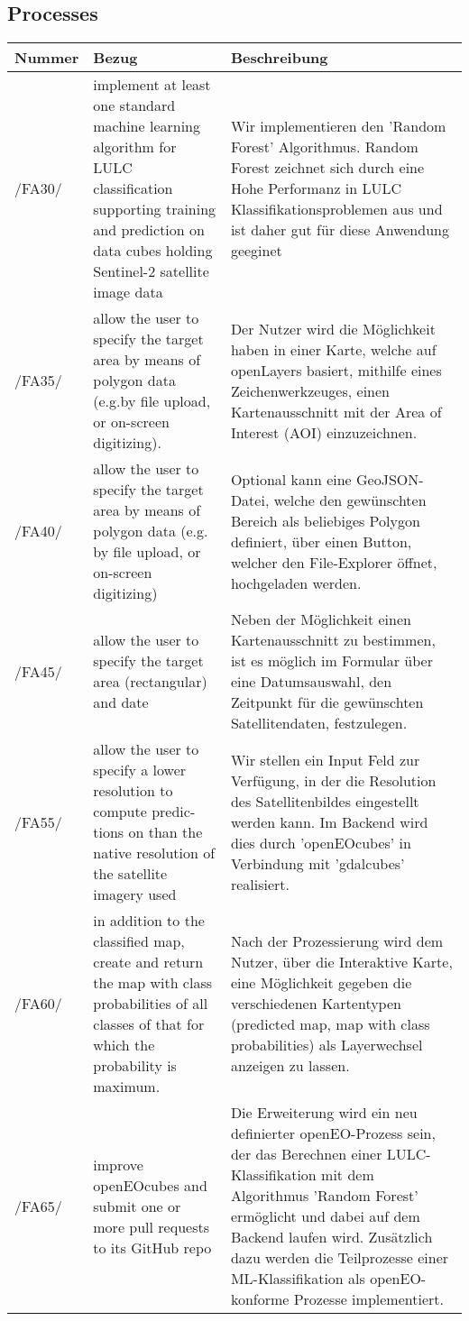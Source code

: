 \documentclass[a4paper,12pt]{article}
\newcommand{\addrow}[3]{#1 &#2 &#3 \\ [0.2cm]}
\newcommand{\addheading}[3]{#1 &#2 &#3\\ \hline }
\newcommand{\tabularhead}{\begin{tabular}{l p{5cm} p{8cm}}
\hline
}
\newenvironment{usecase}{\tabularhead}
{\hline\end{tabular}}
\begin{document}
\subsection{Processes}

\begin{usecase}
  \addheading{Nummer}{Bezug}{Beschreibung} 
  \addrow{/FA30/}{implement at least one standard machine learning algorithm for LULC classification supporting training and prediction on data cubes holding Sentinel-2 satellite image data}{Wir implementieren den 'Random Forest' Algorithmus. Random Forest zeichnet sich durch eine Hohe Performanz in LULC Klassifikationsproblemen aus und ist daher gut für diese Anwendung geeginet}
  \addrow{/FA35/}{allow the user to specify the target area by means of polygon data (e.g.by file upload, or on-screen digitizing).}{Der Nutzer wird die Möglichkeit haben in einer Karte, welche auf openLayers basiert, mithilfe eines Zeichenwerkzeuges, einen Kartenausschnitt mit der Area of Interest (AOI) einzuzeichnen.}
  \addrow{/FA40/}{allow the user to specify the target area by means of polygon
data (e.g. by file upload, or on-screen digitizing)
}{Optional kann eine GeoJSON-Datei, welche den gewünschten Bereich als beliebiges Polygon definiert, über einen Button, welcher den File-Explorer öffnet, hochgeladen werden.}
  \addrow{/FA45/}{allow the user to specify the target area (rectangular) and date
}{Neben der Möglichkeit einen Kartenausschnitt zu bestimmen, ist es möglich im Formular über eine Datumsauswahl, den Zeitpunkt für die gewünschten Satellitendaten, festzulegen.}
  \addrow{/FA55/}{allow the user to specify a lower resolution to compute predic-
tions on than the native resolution of the satellite imagery used}{Wir stellen ein Input Feld zur Verfügung, in der die Resolution des Satellitenbildes eingestellt werden kann. Im Backend wird dies durch 'openEOcubes' in Verbindung mit 'gdalcubes' realisiert.}
  \addrow{/FA60/}{in addition to the classified map, create and return the map with class probabilities of all classes of that for which the probability is maximum.}{Nach der Prozessierung wird dem Nutzer, über die Interaktive Karte, eine Möglichkeit gegeben die verschiedenen Kartentypen (predicted map, map with class probabilities) als Layerwechsel anzeigen zu lassen.}
  \addrow{/FA65/}{improve openEOcubes and submit one or more pull requests to its GitHub repo}{Die Erweiterung wird ein neu definierter openEO-Prozess sein, der das Berechnen einer LULC-Klassifikation mit dem Algorithmus 'Random Forest' ermöglicht und dabei auf dem Backend laufen wird. Zusätzlich dazu werden die Teilprozesse einer ML-Klassifikation als openEO-konforme Prozesse implementiert.}

\end{usecase}
\end{document}
